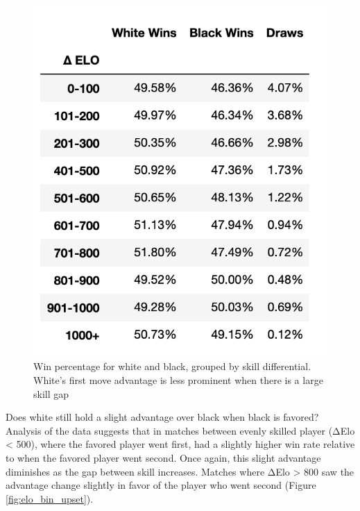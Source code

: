 \documentclass[reprint,
 amsmath,amssymb,nobibnotes,
 aps, floatfix]{revtex4-1}
\begin{document}
\begin{figure}
    \centering
    \includegraphics[scale=.5]{davis_image1.png}
    \caption{Win percentage for white and black, grouped by skill differential. White's first move advantage is less prominent when there is a large skill gap}
    \label{fig:Color_win_elo_gap}
\end{figure}
Does white still hold a slight advantage over black when black is favored? Analysis of the data suggests that in matches between evenly skilled player (ΔElo < 500), where the favored player went first, had a slightly higher win rate relative to when the favored player went second. Once again, this slight advantage diminishes as the gap between skill increases. Matches where ΔElo > 800 saw the advantage change slightly in favor of the player who went second (Figure \ref{fig:elo_bin_upset}).
\end{document}
